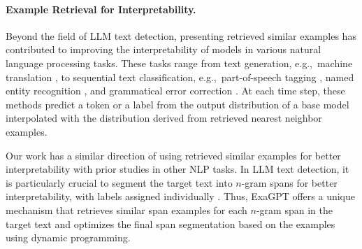 \paragraph{Example Retrieval for Interpretability.}
Beyond the field of LLM text detection, presenting retrieved similar examples has contributed to improving the interpretability of models in various natural language processing tasks.
These tasks range from text generation, e.g.,~machine translation \cite{khandelwal2020nearest}, to sequential text classification, e.g.,~part-of-speech tagging \cite{wiseman-stratos-2019-label}, named entity recognition \cite{jurafsky2020proceedings}, and grammatical error correction \cite{kaneko-etal-2022-interpretability}.
At each time step, these methods predict a token or a label from the output distribution of a base model interpolated with the distribution derived from retrieved nearest neighbor examples.

Our work has a similar direction of using retrieved similar examples for better interpretability with prior studies in other NLP tasks. In LLM text detection, it is particularly crucial to segment the target text into $n$-gram spans for better interpretability, with labels assigned individually \cite{cheng2025beyond}. Thus, ExaGPT offers a unique mechanism that retrieves similar span examples for each $n$-gram span in the target text and optimizes the final span segmentation based on the examples using dynamic programming.